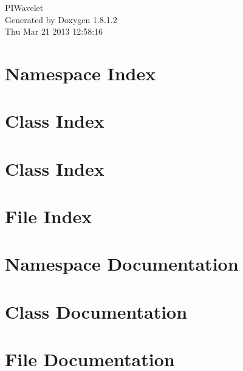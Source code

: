 \documentclass{book}
\begin{document}
\hypersetup{pageanchor=false,citecolor=blue}
\begin{titlepage}
\vspace*{7cm}
\begin{center}
{\Large P\-I\-Wavelet }\\
\vspace*{1cm}
{\large Generated by Doxygen 1.8.1.2}\\
\vspace*{0.5cm}
{\small Thu Mar 21 2013 12:58:16}\\
\end{center}
\end{titlepage}
\clearemptydoublepage
{}
\tableofcontents
\clearemptydoublepage
{}
\hypersetup{pageanchor=true,citecolor=blue}
\chapter{Namespace Index}

\chapter{Class Index}

\chapter{Class Index}

\chapter{File Index}

\chapter{Namespace Documentation}




\chapter{Class Documentation}








\chapter{File Documentation}


\printindex
\end{document}
